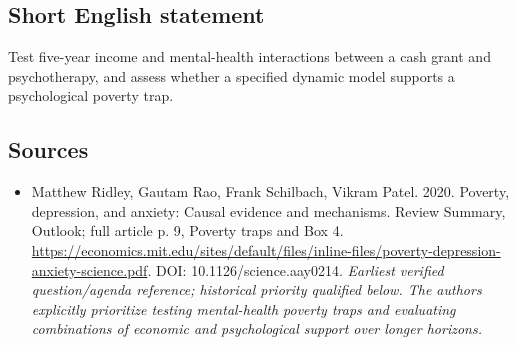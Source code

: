 \documentclass[11pt]{article}
\begin{document}
\subsection{Short English statement}
Test five-year income and mental-health interactions between a cash grant and psychotherapy, and assess whether a specified dynamic model supports a psychological poverty trap.

\subsection{Sources}
\begin{itemize}\raggedright
\item[\textnormal{[S1]}]\hypertarget{source:30007730:1}{} Matthew Ridley, Gautam Rao, Frank Schilbach, Vikram Patel. 2020. Poverty, depression, and anxiety: Causal evidence and mechanisms. Review Summary, Outlook; full article p. 9, Poverty traps and Box 4.
\url{https://economics.mit.edu/sites/default/files/inline-files/poverty-depression-anxiety-science.pdf}.
DOI: 10.1126/science.aay0214.
{\small\textit{Earliest verified question/agenda reference; historical priority qualified below. The authors explicitly prioritize testing mental-health poverty traps and evaluating combinations of economic and psychological support over longer horizons.}}
\end{itemize}
\end{document}
